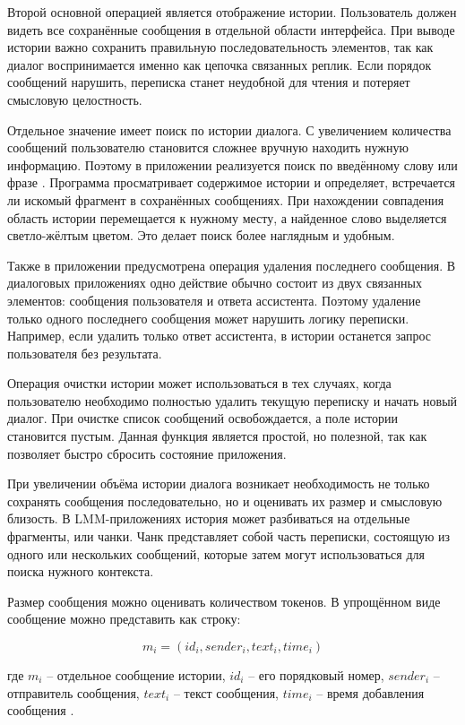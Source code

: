 \documentclass[12pt,a4paper]{article}
\begin{document}
Второй основной операцией является отображение истории. Пользователь должен видеть все сохранённые сообщения в отдельной области интерфейса. При выводе истории важно сохранить правильную последовательность элементов, так как диалог воспринимается именно как цепочка связанных реплик. Если порядок сообщений нарушить, переписка станет неудобной для чтения и потеряет смысловую целостность.

Отдельное значение имеет поиск по истории диалога. С увеличением количества сообщений пользователю становится сложнее вручную находить нужную информацию. Поэтому в приложении реализуется поиск по введённому слову или фразе \cite{ref2,ref10}. Программа просматривает содержимое истории и определяет, встречается ли искомый фрагмент в сохранённых сообщениях. При нахождении совпадения область истории перемещается к нужному месту, а найденное слово выделяется светло-жёлтым цветом. Это делает поиск более наглядным и удобным.

Также в приложении предусмотрена операция удаления последнего сообщения. В диалоговых приложениях одно действие обычно состоит из двух связанных элементов: сообщения пользователя и ответа ассистента. Поэтому удаление только одного последнего сообщения может нарушить логику переписки. Например, если удалить только ответ ассистента, в истории останется запрос пользователя без результата.

Операция очистки истории может использоваться в тех случаях, когда пользователю необходимо полностью удалить текущую переписку и начать новый диалог. При очистке список сообщений освобождается, а поле истории становится пустым. Данная функция является простой, но полезной, так как позволяет быстро сбросить состояние приложения.

При увеличении объёма истории диалога возникает необходимость не только сохранять сообщения последовательно, но и оценивать их размер и смысловую близость. В LMM-приложениях история может разбиваться на отдельные фрагменты, или чанки. Чанк представляет собой часть переписки, состоящую из одного или нескольких сообщений, которые затем могут использоваться для поиска нужного контекста.

Размер сообщения можно оценивать количеством токенов. В упрощённом виде сообщение можно представить как строку:

\[m_i = (id_i, sender_i, text_i, time_i)\]

где $m_i$ -- отдельное сообщение истории, $id_i$ -- его порядковый номер, $sender_i$ -- отправитель сообщения, $text_i$ -- текст сообщения, $time_i$ -- время добавления сообщения \cite{ref6}.
\end{document}
